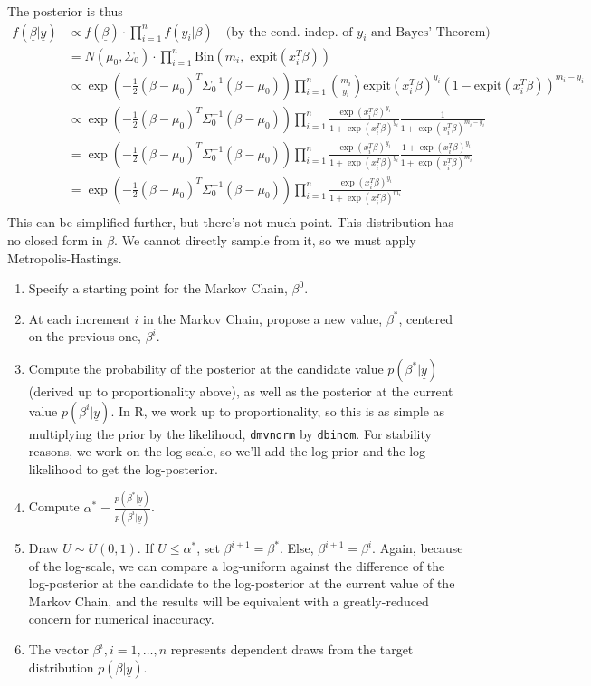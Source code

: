 \documentclass[12pt]{article}
\begin{document}
The posterior is thus
	\begin{align*}
	f(\underline{\beta} | \underline{y}) &\propto f(\underline{\beta}) \cdot \prod_{i=1}^n f(y_i | \beta) \quad \text{(by the cond. indep. of } y_i\text{ and Bayes' Theorem)} \\
	&= N(\mu_0, \Sigma_0) \cdot \prod_{i=1}^n \textrm{Bin}(m_{i},\textrm{ expit}(x_{i}^{T}\beta)) \\
	&\propto \exp{ \left( -\frac{1}{2} (\beta-\mu_0)^T \Sigma_0^{-1} (\beta-\mu_0) \right) } \prod_{i=1}^n \binom{m_i}{y_i} \text{expit}(x_i^T \beta)^{y_i} (1-\text{expit}(x_i^T \beta))^{m_i - y_i} \\
	&\propto \exp \left( -\frac{1}{2} (\beta-\mu_0)^T \Sigma_0^{-1} (\beta-\mu_0) \right) \prod_{i=1}^n \frac{\exp(x_i^T \beta)^{y_i}}{1+\exp(x_i^T \beta)^{y_i}} \frac{1}{1 + \exp(x_i^T \beta)^{m_i - y_i}} \\
	&= \exp \left( -\frac{1}{2} (\beta-\mu_0)^T \Sigma_0^{-1} (\beta-\mu_0) \right) \prod_{i=1}^n \frac{\exp(x_i^T \beta)^{y_i}}{1+\exp(x_i^T \beta)^{y_i}} \frac{1 + \exp(x_i^T \beta)^{y_i}}{1 + \exp(x_i^T \beta)^{m_i}} \\
	&= \exp \left( -\frac{1}{2} (\beta-\mu_0)^T \Sigma_0^{-1} (\beta-\mu_0) \right) \prod_{i=1}^n \frac{\exp(x_i^T \beta)^{y_i}}{1+\exp(x_i^T \beta)^{m_i}} \\
	\end{align*}
This can be simplified further, but there's not much point. This distribution has no closed form in $\beta$. We cannot directly sample from it, so we must apply Metropolis-Hastings.
	\begin{enumerate}
	\item Specify a starting point for the Markov Chain, $\beta^0$.
	\item At each increment $i$ in the Markov Chain, propose a new value, $\beta^*$, centered on the previous one, $\beta^i$.
	\item Compute the probability of the posterior at the candidate value $p(\beta^* | \underline{y})$ (derived up to proportionality above), as well as the posterior at the current value $p(\beta^i | \underline{y})$. In R, we work up to proportionality, so this is as simple as multiplying the prior by the likelihood, \texttt{dmvnorm} by \texttt{dbinom}. For stability reasons, we work on the log scale, so we'll add the log-prior and the log-likelihood to get the log-posterior.
	\item Compute $\alpha^* = \frac{p(\beta^* | \underline{y})}{p(\beta^i | \underline{y})}$.
	\item Draw $U \sim U(0,1)$. If $U \leq \alpha^*$, set $\beta^{i+1} = \beta^*$. Else, $\beta^{i+1} = \beta^{i}$. Again, because of the log-scale, we can compare a log-uniform against the difference of the log-posterior at the candidate to the log-posterior at the current value of the Markov Chain, and the results will be equivalent with a greatly-reduced concern for numerical inaccuracy.
	\item The vector $\beta^i, i=1, \dots, n$ represents dependent draws from the target distribution $p(\beta | \underline{y})$. 
	\end{enumerate}
\end{document}
